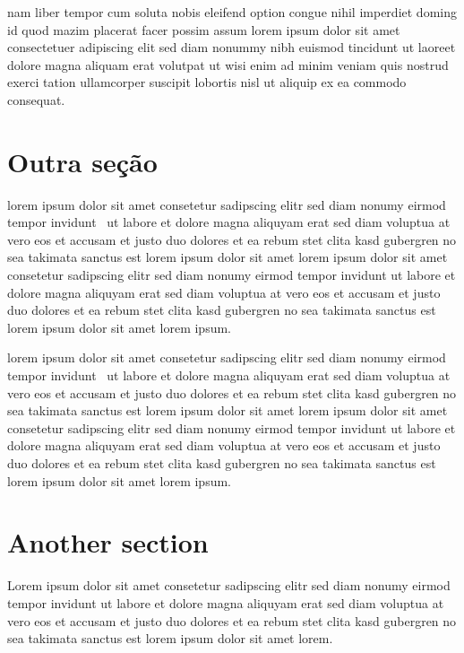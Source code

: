 \documentclass[sigconf]{acmart}
\begin{document}
nam liber tempor cum soluta nobis eleifend option congue nihil imperdiet
doming id quod mazim placerat facer possim assum lorem ipsum dolor sit amet
consectetuer adipiscing elit sed diam nonummy nibh euismod tincidunt ut
laoreet dolore magna aliquam erat volutpat ut wisi enim ad minim veniam quis
nostrud exerci tation ullamcorper suscipit lobortis nisl ut aliquip ex ea
commodo consequat.

\section{Outra seção}

lorem ipsum dolor sit amet consetetur sadipscing elitr sed diam
nonumy eirmod tempor invidunt~\cite{PLASSPAG81} ut labore et
dolore magna aliquyam erat sed diam voluptua at vero eos et
accusam et justo duo dolores et ea rebum stet clita kasd gubergren
no sea takimata sanctus est lorem ipsum dolor sit amet lorem ipsum
dolor sit amet consetetur sadipscing elitr sed diam nonumy eirmod
tempor invidunt ut labore et dolore magna aliquyam erat sed diam
voluptua at vero eos et accusam et justo duo dolores et ea rebum
stet clita kasd gubergren no sea takimata sanctus est lorem ipsum
dolor sit amet lorem ipsum.

lorem ipsum dolor sit amet consetetur sadipscing elitr sed diam
nonumy eirmod tempor invidunt~\cite{PLASSPAG81} ut labore et
dolore magna aliquyam erat sed diam voluptua at vero eos et
accusam et justo duo dolores et ea rebum stet clita kasd gubergren
no sea takimata sanctus est lorem ipsum dolor sit amet lorem ipsum
dolor sit amet consetetur sadipscing elitr sed diam nonumy eirmod
tempor invidunt ut labore et dolore magna aliquyam erat sed diam
voluptua at vero eos et accusam et justo duo dolores et ea rebum
stet clita kasd gubergren no sea takimata sanctus est lorem ipsum
dolor sit amet lorem ipsum.

\section{Another section}

Lorem ipsum dolor sit amet consetetur sadipscing elitr sed diam
nonumy eirmod tempor invidunt ut labore et dolore magna aliquyam
erat sed diam voluptua at vero eos et accusam et justo duo dolores
et ea rebum stet clita kasd gubergren no sea takimata sanctus est
lorem ipsum dolor sit amet lorem.~\cite{XIAOAPL05}
\end{document}
